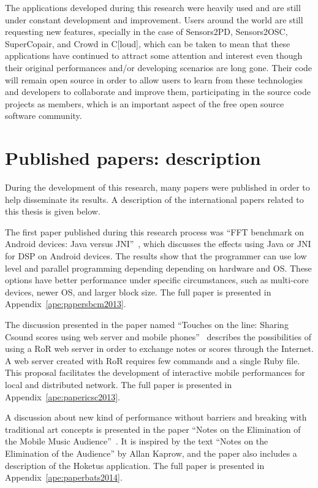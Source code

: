 The applications developed during this research were heavily used and are still under constant development and improvement.
Users around the world are still requesting new features, specially in the case of Sensors2PD, Sensors2OSC, SuperCopair, and Crowd in C[loud], which can be taken to mean that these applications have continued to attract some attention and interest even though their original performances and/or developing scenarios are long gone.
Their code will remain open source in order to allow users to learn from these technologies and developers to collaborate and improve them, participating in the source code projects as members, which is an important aspect of the free open source software community.

\section{Published papers: description}

During the development of this research, many papers were published in order to help disseminate its results.
A description of the international papers related to this thesis is given below.

The first paper published during this research process was ``FFT benchmark on Android devices: Java versus JNI''~\citep{deCarvalhoJunior2013fftbenchmark}, which discusses the effects using Java or JNI for DSP on Android devices.
The results show that the programmer can use low level and parallel programming depending depending on hardware and OS.
These options have better performance under specific circumstances, such as multi-core devices, newer OS, and larger block size.
The full paper is presented in Appendix~\ref{ape:papersbcm2013}.

The discussion presented in the paper named ``Touches on the line: Sharing Csound scores using web server and mobile phones''~\citep{deCarvalhoJunior2013touches} describes the possibilities of using a RoR web server in order to exchange notes or scores through the Internet.
A web server created with RoR requires few commands and a single Ruby file.
This proposal facilitates the development of interactive mobile performances for local and distributed network.
The full paper is presented in Appendix~\ref{ape:papericsc2013}.

A discussion about new kind of performance without barriers and breaking with traditional art concepts is presented in the paper ``Notes on the Elimination of the Mobile Music Audience''~\citep{Bandeira2014notes}.
It is inspired by the text ``Notes on the Elimination of the Audience'' by Allan Kaprow, and the paper also includes a description of the Hoketus application.
The full paper is presented in Appendix~\ref{ape:paperbats2014}.

